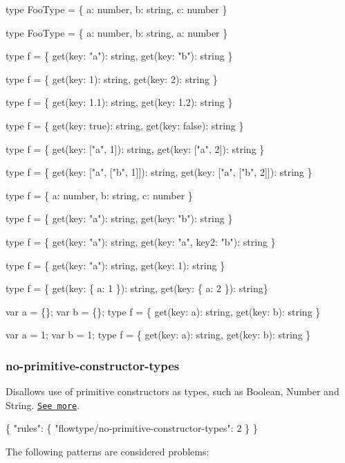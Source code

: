 \begin{DoxyCode}
type FooType = \{ a: number, b: string, c: number \}

type FooType = \{ a: number, b: string, a: number \}

type f = \{ get(key: "a"): string, get(key: "b"): string \}

type f = \{ get(key: 1): string, get(key: 2): string \}

type f = \{ get(key: 1.1): string, get(key: 1.2): string \}

type f = \{ get(key: true): string, get(key: false): string \}

type f = \{ get(key: ["a", 1]): string, get(key: ["a", 2]): string \}

type f = \{ get(key: ["a", ["b", 1]]): string, get(key: ["a", ["b", 2]]): string \}

type f = \{ a: number, b: string, c: number \}

type f = \{ get(key: "a"): string, get(key: "b"): string \}

type f = \{ get(key: "a"): string, get(key: "a", key2: "b"): string \}

type f = \{ get(key: "a"): string, get(key: 1): string \}

type f = \{ get(key: \{ a: 1 \}): string, get(key: \{ a: 2 \}): string\}

var a = \{\}; var b = \{\}; type f = \{ get(key: a): string, get(key: b): string \}

var a = 1; var b = 1; type f = \{ get(key: a): string, get(key: b): string \}
\end{DoxyCode}


\label{_eslint-plugin-flowtype-rules-no-primitive-constructor-types}%
 \subsubsection*{{\ttfamily no-\/primitive-\/constructor-\/types}}

Disallows use of primitive constructors as types, such as {\ttfamily Boolean}, {\ttfamily Number} and {\ttfamily String}. \href{https://flowtype.org/docs/builtins.html}{\tt See more}.


\begin{DoxyCode}
\{
    "rules": \{
        "flowtype/no-primitive-constructor-types": 2
    \}
\}
\end{DoxyCode}


The following patterns are considered problems\+:



